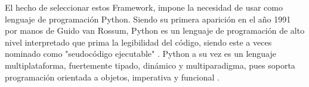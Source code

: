 El hecho de seleccionar estos Framework, impone la necesidad de usar como lenguaje de programación Python.\newline
\newline
Siendo su primera aparición en el año 1991 por manos de Guido van Rossum, Python es un lenguaje de programación de alto nivel interpretado que prima la legibilidad del código, siendo este a veces nominado como "seudocódigo ejecutable" \cite{dierbach2014python}. Python a su vez es un lenguaje multiplataforma, fuertemente tipado, dinámico y multiparadigma, pues soporta programación orientada a objetos, imperativa y funcional \cite{PyDoc} \cite{borges2014python}.
